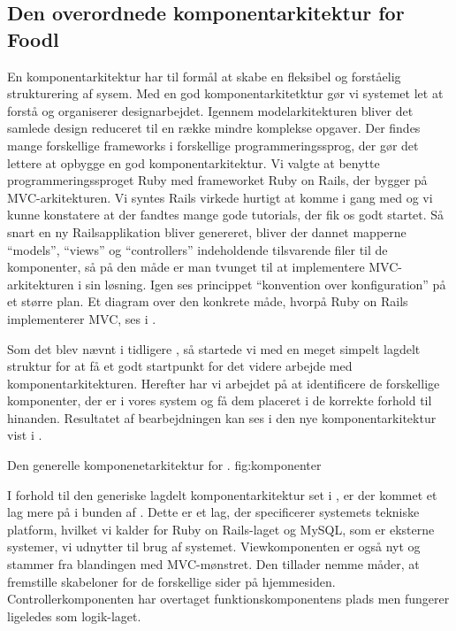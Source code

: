 \subsection{Den overordnede komponentarkitektur for Foodl}
\label{sec:overordnetkomponent}
En komponentarkitektur har til formål at skabe en fleksibel og forståelig strukturering af sysem. Med en god komponentarkitetktur gør vi systemet let at forstå og organiserer designarbejdet. Igennem modelarkitekturen bliver det samlede design reduceret til en række mindre komplekse opgaver\cite[s.~185]{ooad}. Der findes mange forskellige frameworks i forskellige programmeringssprog, der gør det lettere at opbygge en god komponentarkitektur. Vi valgte at benytte programmeringssproget Ruby med frameworket Ruby on Rails, der bygger på MVC-arkitekturen. Vi syntes Rails virkede hurtigt at komme i gang med og vi kunne konstatere at der fandtes mange gode tutorials, der fik os godt startet. Så snart en ny Railsapplikation bliver genereret, bliver der dannet mapperne ``models'', ``views'' og ``controllers'' indeholdende tilsvarende filer til de komponenter, så på den måde er man tvunget til at implementere MVC-arkitekturen i sin løsning. Igen ses princippet ``konvention over konfiguration'' på et større plan. Et diagram over den konkrete måde, hvorpå Ruby on Rails implementerer MVC, ses i .

Som det blev nævnt i tidligere , så startede vi med en meget simpelt lagdelt struktur for at få et godt startpunkt for det videre arbejde med komponentarkitekturen. Herefter har vi arbejdet på at identificere de forskellige komponenter, der er i vores system og få dem placeret i de korrekte forhold til hinanden. Resultatet af bearbejdningen kan ses i den nye komponentarkitektur vist i .

	{Den generelle komponenetarkitektur for \Foodl{}.}
	{fig:komponenter}

I forhold til den generiske lagdelt komponentarkitektur set i , er der kommet et lag mere på i bunden af . Dette er et lag, der specificerer systemets tekniske platform, hvilket vi kalder for Ruby on Rails-laget og MySQL, som er eksterne systemer, vi udnytter til brug af systemet. Viewkomponenten er også nyt og stammer fra blandingen med MVC-mønstret. Den tillader nemme måder, at fremstille skabeloner for de forskellige sider på hjemmesiden. Controllerkomponenten har overtaget funktionskomponentens plads men fungerer ligeledes som logik-laget.

